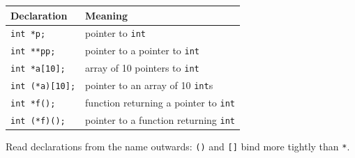 \begin{center}
\renewcommand{\arraystretch}{1.25}
\begin{tabular}{l l}
\toprule
\textbf{Declaration} & \textbf{Meaning} \\
\midrule
\texttt{int *p;} & pointer to \texttt{int} \\
\texttt{int **pp;} & pointer to a pointer to \texttt{int} \\
\texttt{int *a[10];} & array of 10 pointers to \texttt{int} \\
\texttt{int (*a)[10];} & pointer to an array of 10 \texttt{int}s \\
\texttt{int *f();} & function returning a pointer to \texttt{int} \\
\texttt{int (*f)();} & pointer to a function returning \texttt{int} \\
\bottomrule
\end{tabular}

\smallskip
{\small Read declarations from the name outwards: \texttt{()} and \texttt{[]} bind more tightly than \texttt{*}.}
\end{center}
